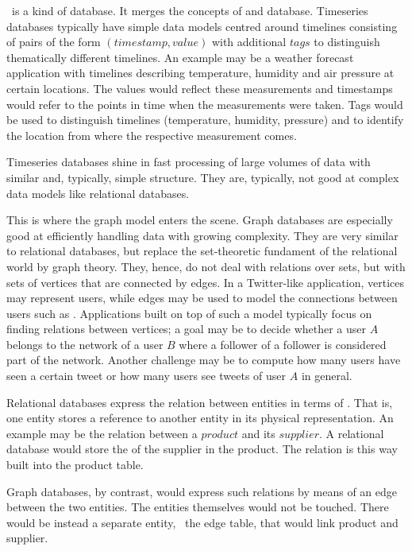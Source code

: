 \nowdb\ is a kind of database.
It merges the concepts
of  and  database.
Timeseries databases typically have simple
data models centred around timelines
consisting of pairs of the form
$(timestamp,value)$
with additional $tags$ to
distinguish thematically different timelines.
An example may be a weather forecast
application with timelines describing
temperature, humidity and air pressure
at certain locations. The values would
reflect these measurements and timestamps
would refer to the points in time when
the measurements were taken. Tags would
be used to distinguish timelines
(temperature, humidity, pressure) and
to identify the location from where the
respective measurement comes.

Timeseries databases shine in 
fast processing of large volumes of
data with similar and, typically, simple structure.
They are, typically, not good at complex
data models like relational databases.

This is where the graph model enters the scene.
Graph databases are especially good
at efficiently handling
data with growing complexity.
They are very similar to relational
databases, but replace the set-theoretic
fundament of the relational world by
graph theory. They, hence, do not deal
with relations over sets, but with
sets of vertices that are connected
by edges. In a Twitter-like application,
vertices may represent users, while
edges may be used to model
the connections between users such as
.
Applications built on top of such a model
typically focus on finding relations
between vertices; a goal may be to decide
whether a user $A$ belongs to the network
of a user $B$ where a follower of a
follower is considered part of
the network. Another challenge may be
to compute how many users have seen
a certain tweet or how many users
see tweets of user $A$ in general.

Relational databases
express the relation between entities
in terms of .
That is, one entity stores a reference
to another entity in its physical
representation.
An example may be the relation
between a $product$ and its $supplier$.
A relational database would store
the  of the supplier
in the product.
The relation is this way built into
the product table.

Graph databases, by contrast,
would express such relations
by means of an edge between the two entities.
The entities themselves would not be touched.
There would be instead a separate entity,
\viz\ the edge table, that would link
product and supplier.

